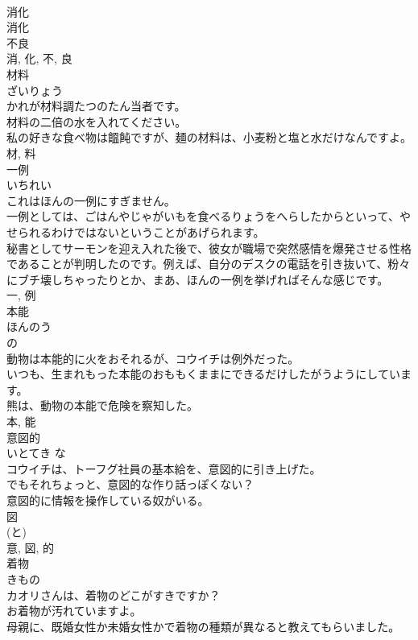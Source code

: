 \documentclass[8pt]{extreport}
\begin{document}
\begin{CJK}{UTF8}{min}
\\	消化 
\\	消化 
\\	不良 
\\	消, 化, 不, 良	
\\	材料	
\\	ざいりょう	
\\	かれが材料調たつのたん当者です。	
\\	材料の二倍の水を入れてください。	
\\	私の好きな食べ物は饂飩ですが、麺の材料は、小麦粉と塩と水だけなんですよ。	
\\	材, 料	
\\	一例	
\\	いちれい	
\\	これはほんの一例にすぎません。	
\\	一例としては、ごはんやじゃがいもを食べるりょうをへらしたからといって、やせられるわけではないということがあげられます。	
\\	秘書としてサーモンを迎え入れた後で、彼女が職場で突然感情を爆発させる性格であることが判明したのです。例えば、自分のデスクの電話を引き抜いて、粉々にブチ壊しちゃったりとか、まあ、ほんの一例を挙げればそんな感じです。	
\\	一, 例	
\\	本能	
\\	ほんのう	
\\	の 
\\	動物は本能的に火をおそれるが、コウイチは例外だった。	
\\	いつも、生まれもった本能のおももくままにできるだけしたがうようにしています。	
\\	熊は、動物の本能で危険を察知した。	
\\	本, 能	
\\	意図的	
\\	いとてき	な 
\\	コウイチは、トーフグ社員の基本給を、意図的に引き上げた。	
\\	でもそれちょっと、意図的な作り話っぽくない？	
\\	意図的に情報を操作している奴がいる。	
\\	図 
\\	(と) 
\\	意, 図, 的	
\\	着物	
\\	きもの	
\\	カオリさんは、着物のどこがすきですか？	
\\	お着物が汚れていますよ。	
\\	母親に、既婚女性か未婚女性かで着物の種類が異なると教えてもらいました。	

\end{CJK}
\end{document}

